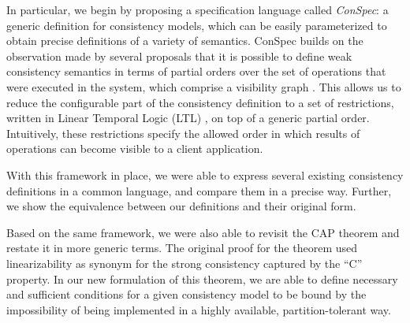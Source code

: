 \documentclass[conference]{IEEEtran}
\begin{document}
	In particular, we begin by proposing a specification language called
	\emph{ConSpec}: a generic definition for consistency models, which can
	be easily parameterized to obtain precise definitions of a variety of
	semantics. ConSpec builds on the observation made by several proposals
	that it is possible to define weak consistency semantics in terms of
	partial orders over the set of operations that were executed in the
	system, which comprise a visibility graph
	\cite{Li:2012:MGS:2387880.2387906, Gotsman:2016:CIS:2837614.2837625, cheng-papoc}. This allows us to reduce
	the configurable part of the consistency definition to a set of restrictions,
	written in Linear Temporal Logic (LTL) \cite{4567924}, on top of a generic partial order.
	Intuitively, these restrictions specify the allowed order in which results of operations can become visible to a client application.
	
	
	With this framework in place, we were able to express several existing
	consistency definitions in a common language, and compare them in a precise
	way. Further, we show the equivalence between our definitions and  their original form. %
	
	Based on the same framework, we were also able to revisit the CAP theorem \cite{brew:cap, Gilbert:2002:BCF:564585.564601} and restate it in more generic terms. The original proof for the theorem used linearizability as synonym for the strong consistency captured by the ``C'' property. In our new formulation of this theorem, we are able to define necessary and sufficient conditions for a given consistency model to be bound by the impossibility of being implemented in a highly available, partition-tolerant way.
	
\end{document}
